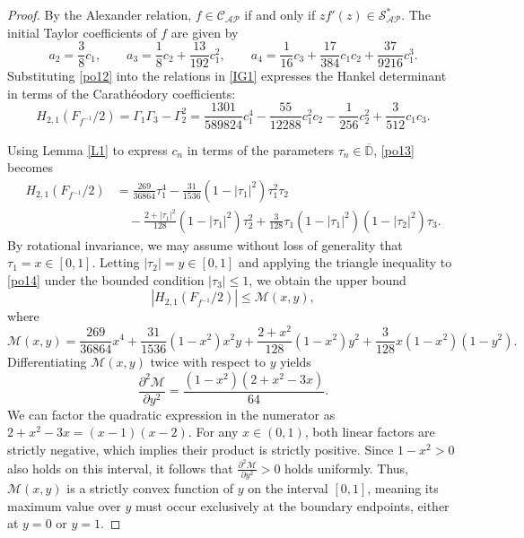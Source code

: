 \documentclass[10pt,a4paper]{amsart}
\numberwithin{equation}{section}
\begin{document}
\begin{proof}
By the Alexander relation, $f \in \mathcal{C}_{\mathcal{AP}}$ if and only if $zf'(z) \in \mathcal{S}_{\mathcal{AP}}^{*}$. The initial Taylor coefficients of $f$ are given by
\begin{equation}\label{po12}
a_2 = \frac{3}{8}c_1, \qquad a_3 = \frac{1}{8}c_2 + \frac{13}{192}c_1^2, \qquad a_4 = \frac{1}{16}c_3 + \frac{17}{384}c_1c_2 + \frac{37}{9216}c_1^3.
\end{equation}
Substituting \eqref{po12} into the relations in \eqref{IG1} expresses the Hankel determinant in terms of the Carath\'{e}odory coefficients:
\begin{equation}\label{po13}
H_{2,1}\left(F_{f^{-1}}/2\right) = \Gamma_1\Gamma_3-\Gamma_2^2 = \frac{1301}{589824}c_1^4 -\frac{55}{12288}c_1^2c_2 -\frac{1}{256}c_2^2 +\frac{3}{512}c_1c_3.
\end{equation}

Using Lemma \ref{L1} to express $c_n$ in terms of the parameters $\tau_n \in \overline{\mathbb{D}}$, \eqref{po13} becomes
\begin{equation}\label{po14}
\begin{aligned}
H_{2,1}\left(F_{f^{-1}}/2\right) &= \frac{269}{36864}\tau_1^4 -\frac{31}{1536}(1-|\tau_1|^2)\tau_1^2\tau_2 \\
&\quad -\frac{2+|\tau_1|^2}{128}(1-|\tau_1|^2)\tau_2^2 +\frac{3}{128}\tau_1(1-|\tau_1|^2)(1-|\tau_2|^2)\tau_3.
\end{aligned}
\end{equation}
By rotational invariance, we may assume without loss of generality that $\tau_1 = x \in [0,1]$. Letting $|\tau_2| = y \in [0,1]$ and applying the triangle inequality to \eqref{po14} under the bounded condition $|\tau_3| \le 1$, we obtain the upper bound
\[
\left|H_{2,1}\left(F_{f^{-1}}/2\right)\right| \leq \mathcal{M}(x,y),
\]
where
\[
\mathcal{M}(x,y) = \frac{269}{36864}x^4 +\frac{31}{1536}(1-x^2)x^2y +\frac{2+x^2}{128}(1-x^2)y^2 +\frac{3}{128}x(1-x^2)(1-y^2).
\]
Differentiating $\mathcal{M}(x,y)$ twice with respect to $y$ yields
\[
\frac{\partial^2\mathcal{M}}{\partial y^2} = \frac{(1-x^2)(2+x^2-3x)}{64}.
\]
We can factor the quadratic expression in the numerator as $2+x^2-3x = (x-1)(x-2)$. For any $x \in (0,1)$, both linear factors are strictly negative, which implies their product is strictly positive. Since $1-x^2 > 0$ also holds on this interval, it follows that $\frac{\partial^2\mathcal{M}}{\partial y^2} > 0$ holds uniformly. Thus, $\mathcal{M}(x,y)$ is a strictly convex function of $y$ on the interval $[0,1]$, meaning its maximum value over $y$ must occur exclusively at the boundary endpoints, either at $y=0$ or $y=1$.


\end{proof}
\end{document}
